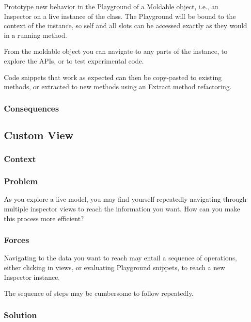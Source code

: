 \documentclass[sigconf]{acmart}
\begin{document}
Prototype new behavior in the Playground of a Moldable object, i.e., an Inspector on a live instance of the class. The Playground will be bound to the context of the instance, so self and all slots can be accessed exactly as they would in a running method.

From the moldable object you can navigate to any parts of the instance, to explore the APIs, or to test experimental code.

Code snippets that work as expected can then be copy-pasted to existing methods, or extracted to new methods using an Extract method refactoring.


\subsubsection*{Consequences}

\subsection*{Custom View}\label{pat:customView}
\subsubsection*{Context}
\subsubsection*{Problem}

As you explore a live model, you may find yourself repeatedly navigating through multiple inspector views to reach the information you want. How can you make this process more efficient?

\subsubsection*{Forces}

Navigating to the data you want to reach may entail a sequence of operations, either clicking in views, or evaluating Playground snippets, to reach a new Inspector instance.

The sequence of steps may be cumbersome to follow repeatedly.

\subsubsection*{Solution}
\end{document}
